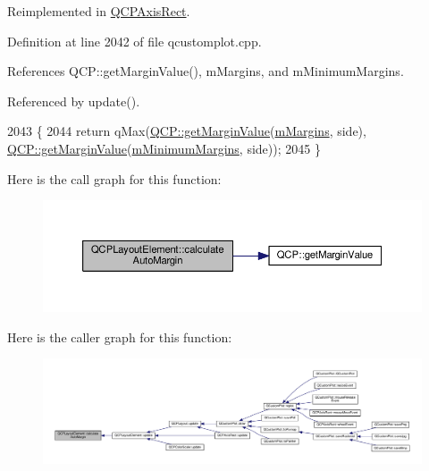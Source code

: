 Reimplemented in \hyperlink{class_q_c_p_axis_rect_ae79f18302e6507586aa8c032a5f9ed1c}{Q\+C\+P\+Axis\+Rect}.



Definition at line 2042 of file qcustomplot.\+cpp.



References Q\+C\+P\+::get\+Margin\+Value(), m\+Margins, and m\+Minimum\+Margins.



Referenced by update().


\begin{DoxyCode}
2043 \{
2044   \textcolor{keywordflow}{return} qMax(\hyperlink{namespace_q_c_p_a23a2679d3495c444acc26acc61e35b5b}{QCP::getMarginValue}(\hyperlink{class_q_c_p_layout_element_ac2a32b99ee527ca5dfff9da03628fe94}{mMargins}, side), 
      \hyperlink{namespace_q_c_p_a23a2679d3495c444acc26acc61e35b5b}{QCP::getMarginValue}(\hyperlink{class_q_c_p_layout_element_a5ba71f25d1af4bb092b28df618538e63}{mMinimumMargins}, side));
2045 \}
\end{DoxyCode}


Here is the call graph for this function\+:\nopagebreak
\begin{figure}[H]
\begin{center}
\leavevmode
\includegraphics[width=350pt]{class_q_c_p_layout_element_a005c9f0fe84bc1591a2cf2c46fd477b4_cgraph}
\end{center}
\end{figure}




Here is the caller graph for this function\+:\nopagebreak
\begin{figure}[H]
\begin{center}
\leavevmode
\includegraphics[width=350pt]{class_q_c_p_layout_element_a005c9f0fe84bc1591a2cf2c46fd477b4_icgraph}
\end{center}
\end{figure}


